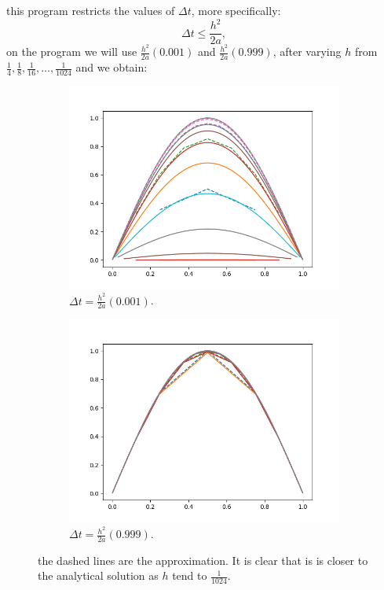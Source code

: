 \documentclass{article}
\begin{document}
this program restricts the values of $\Delta t$, more specifically:
$$\Delta t \leq \frac{h^2}{2a},$$
on the program we will use $\frac{h^2}{2a} (0.001)$ and $\frac{h^2}{2a}(0.999)$, after varying $h$ from $\frac{1}{4}, \frac{1}{8}, \frac{1}{16}, \dots,  \frac{1}{1024}$ and we obtain:
\newpage
\begin{figure}[h!]
	\centering
	\begin{subfigure}[b]{0.4\linewidth}
		\includegraphics[width=\linewidth]{1.png}
		\caption{$\Delta t = \frac{h^2}{2a}(0.001)$.}
	\end{subfigure}
	\begin{subfigure}[b]{0.4\linewidth}
		\includegraphics[width=\linewidth]{2.png}
		\caption{$\Delta t = \frac{h^2}{2a} (0.999)$.}
	\end{subfigure}
	\caption{the dashed lines are the approximation. It is clear that is is closer to the analytical solution as $h$ tend to $\frac{1}{1024}$.}
	\label{fig:cmp1}
\end{figure}
\end{document}
